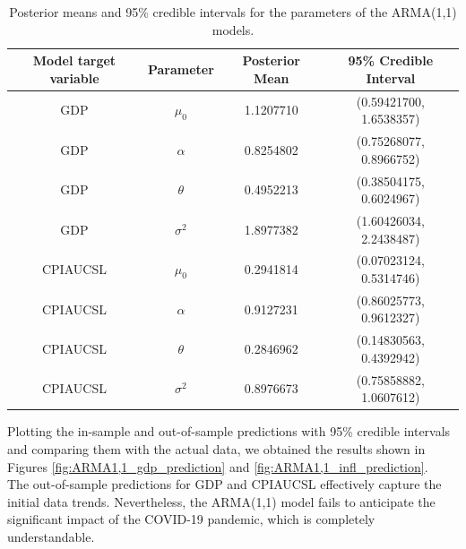 \begin{table}[H]
    \centering
    \begin{tabular}{|c|c|c|c|}
        \hline
        \textbf{Model target variable } & \textbf{Parameter } & \textbf{Posterior Mean } & \textbf{95\% Credible Interval } \\
        \hline
        GDP      & $\mu_0$    & 1.1207710 & (0.59421700, 1.6538357) \\
        GDP      & $\alpha$   & 0.8254802 & (0.75268077, 0.8966752) \\
        GDP      & $\theta$   & 0.4952213 & (0.38504175, 0.6024967) \\
        GDP      & $\sigma^2$ & 1.8977382 & (1.60426034, 2.2438487) \\
        CPIAUCSL & $\mu_0$    & 0.2941814 & (0.07023124, 0.5314746) \\
        CPIAUCSL & $\alpha$   & 0.9127231 & (0.86025773, 0.9612327) \\
        CPIAUCSL & $\theta$   & 0.2846962 & (0.14830563, 0.4392942) \\
        CPIAUCSL & $\sigma^2$ & 0.8976673 & (0.75858882, 1.0607612) \\
        \hline
    \end{tabular}
    \caption{Posterior means and 95\% credible intervals for the parameters of the ARMA(1,1) models.}
    \label{tab:ARMA1,1_posteriors}
\end{table}
Plotting the in-sample and out-of-sample predictions with 95\% credible intervals and comparing them with the actual data, we obtained the results shown in Figures \ref{fig:ARMA1,1_gdp_prediction} and \ref{fig:ARMA1,1_infl_prediction}. \\
The out-of-sample predictions for GDP and CPIAUCSL effectively capture the initial data trends. Nevertheless, the ARMA(1,1) model fails to anticipate the significant impact of the COVID-19 pandemic, which is completely understandable.
